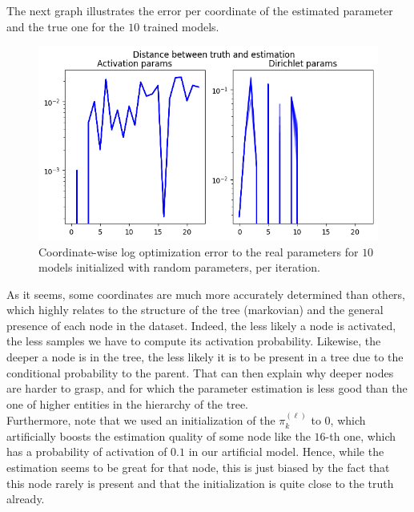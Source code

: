 The next graph illustrates the error per coordinate of the estimated parameter and the true one for the $10$ trained models.
\begin{figure}[H]
    \centering
    \includegraphics[scale=0.6]{images/markovian_tree_model_error_estimators}
    \caption{Coordinate-wise log optimization error to the real parameters for $10$ models initialized with random parameters, per iteration.}
    \label{fig:markovian_tree_model_error_estimations}
\end{figure}

As it seems, some coordinates are much more accurately determined than others, which highly relates to the structure of the tree (markovian)
and the general presence of each node in the dataset.
Indeed, the less likely a node is activated, the less samples we have to compute its activation probability.
Likewise, the deeper a node is in the tree, the less likely it is to be present in a tree due to the conditional probability to the parent.
That can then explain why deeper nodes are harder to grasp, and for which the parameter estimation is less good than the one of higher entities in the hierarchy of the tree. \\

Furthermore, note that we used an initialization of the $\pi_k^{(\ell)}$ to $0$, which artificially boosts the estimation quality of some node like the $16$-th one, which has a probability of activation of $0.1$
in our artificial model.
Hence, while the estimation seems to be great for that node, this is just biased by the fact that this node rarely is present and that the initialization is quite close to the truth already. \\

